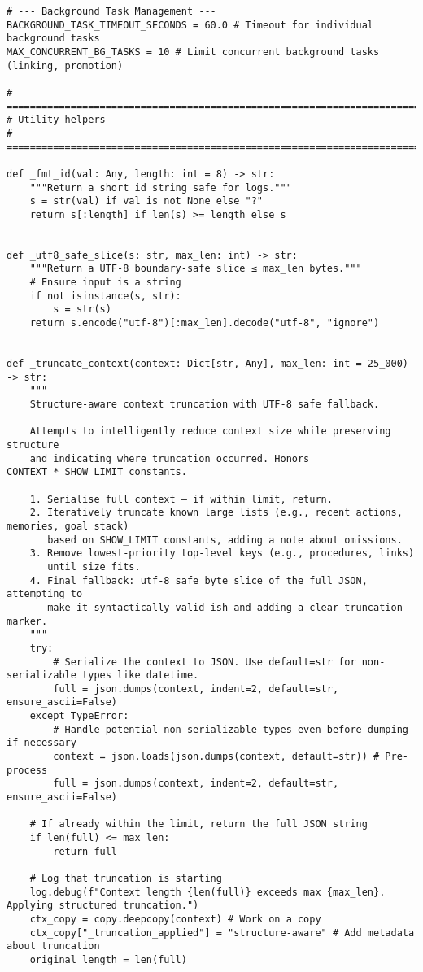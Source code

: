 \documentclass[12pt,a4paper]{article}
\begin{document}
\begin{pageablecode}
\begin{verbatim}
# --- Background Task Management ---
BACKGROUND_TASK_TIMEOUT_SECONDS = 60.0 # Timeout for individual background tasks
MAX_CONCURRENT_BG_TASKS = 10 # Limit concurrent background tasks (linking, promotion)

# ==========================================================================
# Utility helpers
# ==========================================================================

def _fmt_id(val: Any, length: int = 8) -> str:
    """Return a short id string safe for logs."""
    s = str(val) if val is not None else "?"
    return s[:length] if len(s) >= length else s


def _utf8_safe_slice(s: str, max_len: int) -> str:
    """Return a UTF‑8 boundary‑safe slice ≤ max_len bytes."""
    # Ensure input is a string
    if not isinstance(s, str):
        s = str(s)
    return s.encode("utf‑8")[:max_len].decode("utf‑8", "ignore")


def _truncate_context(context: Dict[str, Any], max_len: int = 25_000) -> str:
    """
    Structure‑aware context truncation with UTF‑8 safe fallback.

    Attempts to intelligently reduce context size while preserving structure
    and indicating where truncation occurred. Honors CONTEXT_*_SHOW_LIMIT constants.

    1. Serialise full context – if within limit, return.
    2. Iteratively truncate known large lists (e.g., recent actions, memories, goal stack)
       based on SHOW_LIMIT constants, adding a note about omissions.
    3. Remove lowest‑priority top‑level keys (e.g., procedures, links)
       until size fits.
    4. Final fallback: utf‑8 safe byte slice of the full JSON, attempting to
       make it syntactically valid-ish and adding a clear truncation marker.
    """
    try:
        # Serialize the context to JSON. Use default=str for non-serializable types like datetime.
        full = json.dumps(context, indent=2, default=str, ensure_ascii=False)
    except TypeError:
        # Handle potential non-serializable types even before dumping if necessary
        context = json.loads(json.dumps(context, default=str)) # Pre-process
        full = json.dumps(context, indent=2, default=str, ensure_ascii=False)

    # If already within the limit, return the full JSON string
    if len(full) <= max_len:
        return full

    # Log that truncation is starting
    log.debug(f"Context length {len(full)} exceeds max {max_len}. Applying structured truncation.")
    ctx_copy = copy.deepcopy(context) # Work on a copy
    ctx_copy["_truncation_applied"] = "structure‑aware" # Add metadata about truncation
    original_length = len(full)


\end{verbatim}
\end{pageablecode}
\end{document}
